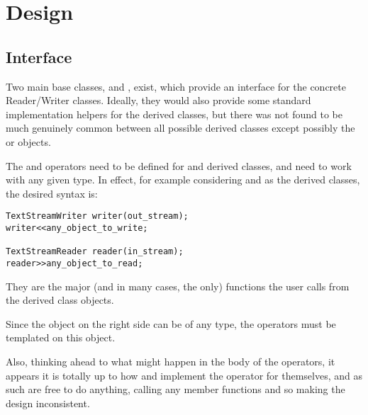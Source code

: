 \documentclass{article}
\begin{document}
\section{Design}
\subsection{Interface}

\begin{description}
\item {}
\item {}
\end{description}

\begin{description}
\item {}
\item {}
\end{description}
\eoclass


Two main base classes,  and ,
exist, which provide an interface for the concrete Reader/Writer
classes. Ideally, they would also provide some standard implementation
helpers for the derived classes, but there was not found to be much
genuinely common between all possible derived classes except possibly
the  or  objects.

The \code{<<} and \code{>>} operators need to be defined for
 and  derived classes, and need
to work with any given type. In effect, for example considering
 and  as the derived
classes, the desired syntax is:

\begin{lstlisting}
TextStreamWriter writer(out_stream);
writer<<any_object_to_write;

TextStreamReader reader(in_stream);
reader>>any_object_to_read;
\end{lstlisting}

They are the major (and in many cases, the only) functions the user
calls from the derived class objects.


Since the object on the right side can be of any type, the operators
must be templated on this object.  

Also, thinking ahead to what might happen in the body of the
operators, it appears it is totally up to how 
and  implement the operator for themselves, and
as such are free to do anything, calling any member functions and so
making the design inconsistent.
\end{document}
